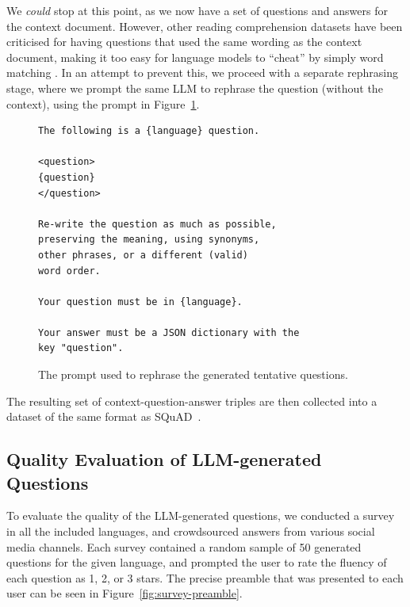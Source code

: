 \documentclass[10pt, a4paper]{article}
\begin{document}
We \textit{could} stop at this point, as we now have a set of questions and answers for
the context document. However, other reading comprehension datasets have been criticised
for having questions that used the same wording as the context document, making it too
easy for language models to ``cheat'' by simply word matching
\cite{weissenborn2017making, jia2017adversarial}. In an attempt to prevent this, we
proceed with a separate rephrasing stage, where we prompt the same LLM to rephrase the
question (without the context), using the prompt in Figure~\ref{fig:rephrasing-prompt}.

\begin{figure}
\scriptsize
\begin{verbatim}
The following is a {language} question.

<question>
{question}
</question>

Re-write the question as much as possible,
preserving the meaning, using synonyms,
other phrases, or a different (valid)
word order.

Your question must be in {language}.

Your answer must be a JSON dictionary with the
key "question".
\end{verbatim}
\caption{The prompt used to rephrase the generated tentative questions.}
\label{fig:rephrasing-prompt}
\end{figure}

The resulting set of context-question-answer triples are then collected into a dataset
of the same format as SQuAD~.


\subsection{Quality Evaluation of LLM-generated Questions}
\label{sec:quality-evaluation}

To evaluate the quality of the LLM-generated questions, we conducted a survey in all the
included languages, and crowdsourced answers from various social media channels. Each
survey contained a random sample of 50 generated questions for the given language, and
prompted the user to rate the fluency of each question as 1, 2, or 3 stars. The precise
preamble that was presented to each user can be seen in
Figure~\ref{fig:survey-preamble}.
\end{document}
